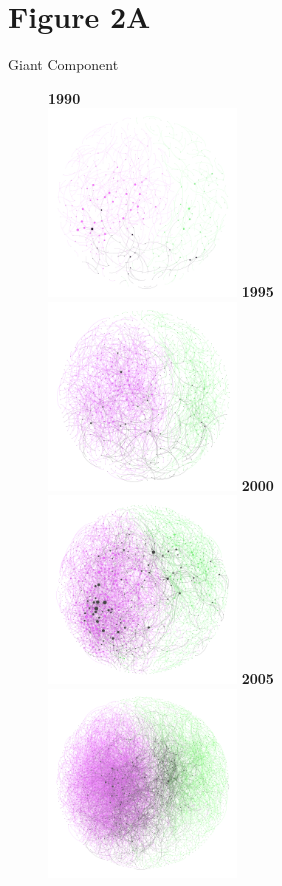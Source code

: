 \documentclass[10pt]{article}         %
\begin{document}
\section{Figure 2A}
Giant Component\\
\begin{figure}[!htb]
    \textbf{1990}\\
    \includegraphics[width=5cm, height=5cm]{Fig2A1990.png}
  \endminipage\hfill
    \textbf{1995}\\
    \includegraphics[width=5cm, height=5cm]{Fig2A1995.png}
  \endminipage\hfill
    \textbf{2000}\\
    \includegraphics[width=5cm, height=5cm]{Fig2A2000.png}
  \endminipage\hfill
    \textbf{2005}\\
    \includegraphics[width=5cm, height=5cm]{Fig2A2005.png}

\end{figure}
\end{document}
